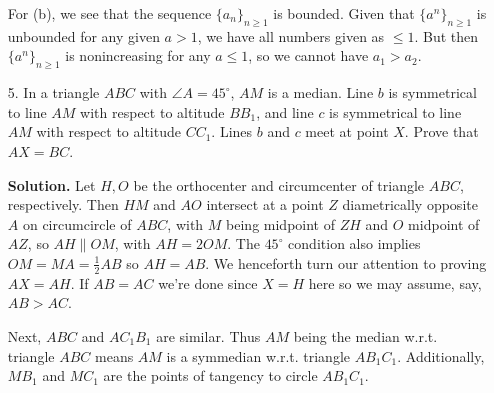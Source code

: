 \documentclass[11pt,a4paper]{article}
\begin{document}
\begin{enumerate}
    For (b), we see that the sequence $\{a_n\}_{n\ge 1}$ is bounded. 
    Given that $\{a^n\}_{n\ge 1}$ is unbounded for any given $a>1$, we have all numbers given as $\le 1$. 
    But then $\{a^n\}_{n\ge 1}$ is nonincreasing for any $a\le 1$, 
    so we cannot have $a_1>a_2$. 
    
    \item[5.]
    In a triangle $ABC$ with $\angle A = 45^{\circ}$, 
    $AM$ is a median. 
    Line $b$ is symmetrical to line $AM$
    with respect to altitude $BB_1$, and line $c$ is symmetrical to line $AM$ with respect to altitude
    $CC_1$. Lines $b$ and $c$ meet at point $X$. Prove that $AX = BC$.
    
    \textbf{Solution.}
    Let $H, O$ be the orthocenter and circumcenter of triangle $ABC$, respectively. 
    Then $HM$ and $AO$ intersect at a point $Z$ diametrically opposite $A$ on circumcircle of $ABC$, 
    with $M$ being midpoint of $ZH$ and $O$ midpoint of $AZ$, so $AH\parallel OM$, 
    with $AH=2OM$. The $45^{\circ}$ condition also implies 
    $OM=MA=\frac 12 AB$ so $AH=AB$. 
    We henceforth turn our attention to proving $AX=AH$. 
    If $AB=AC$ we're done since $X=H$ here so we may assume, say, $AB>AC$. 
    
    Next, $ABC$ and $AC_1B_1$ are similar. Thus $AM$ being the median w.r.t. triangle $ABC$ means $AM$ is a symmedian w.r.t. triangle $AB_1C_1$. 
    Additionally, $MB_1$ and $MC_1$ are the points of tangency to circle $AB_1C_1$. 
    

\end{enumerate}
\end{document}
